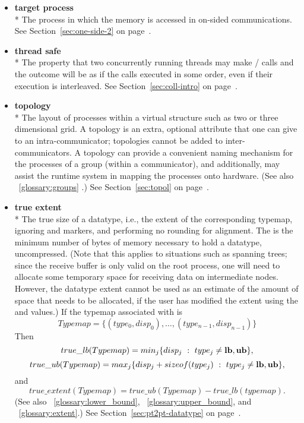 \begin{itemize}
\label{glossary:target_process}
\item \textbf{ target process} \\*
The process in which the memory is accessed in on-sided communications.
See Section~\ref{sec:one-side-2} on page~\pageref{sec:one-side-2}.

\label{glossary:thread_safe}
\item \textbf{ thread safe} \\*
The property that two concurrently
running threads may make \MPI/ calls and the outcome will be as if the
calls executed in some order, even if their execution is interleaved.
See Section~\ref{sec:coll-intro} on page~\pageref{sec:coll-intro}.

\label{glossary:topology}
\item \textbf{ topology} \\* 
The layout of processes within a virtual structure such as two or three
dimensional grid.
A topology is an extra,
optional attribute that one can give to an intra-communicator; topologies
cannot be added to inter-communicators.  A topology can provide a convenient
naming mechanism for the processes of a group (within a communicator), and
additionally, may assist the runtime system in mapping the processes onto
hardware.
(See also ~\ref{glossary:groups} .)
See Section~\ref{sec:topol} on page~\pageref{sec:topol}.

\label{glossary:true_extent}
\item \textbf{ true extent} \\*
The true size of a datatype, i.e., the extent of the corresponding typemap, ignoring
 and  markers, and performing no
rounding for alignment.  The  is the minimum number of bytes of
memory necessary to hold a datatype, uncompressed. (Note that this applies
to situations such as spanning trees; since the receive buffer is only valid on the
root process, one will need to allocate some temporary space for
receiving data on intermediate nodes.  However, the datatype extent
cannot be used as an estimate of the amount of space that needs to be
allocated, if the user has modified the extent
using the  and  values.)
If the typemap associated with
 is
\[
Typemap = \{ (type_0, disp_0), \ldots , (type_{n-1}, disp_{n-1})\}
\]
Then
\[
true\_lb(Typemap) = min_j  \{ disp_j ~:~ type_j \ne {\bf lb, ub} \},
\]
\[
true\_ub (Typemap) = max_j \{disp_j + sizeof(type_j) ~:~ type_j \ne
{\bf lb, ub}\} ,
\]
and
\[
true\_extent (Typemap) = true\_ub(Typemap) - true\_lb(typemap).
\]
(See also ~\ref{glossary:lower_bound}, ~\ref{glossary:upper_bound}, and ~\ref{glossary:extent}.)
See Section~\ref{sec:pt2pt-datatype} on page~\pageref{sec:pt2pt-datatype}.


\end{itemize}
